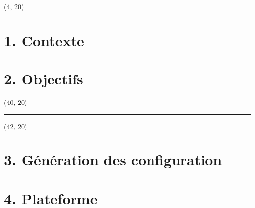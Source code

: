 \documentclass{beamer}
\begin{document}
\setlength{\TPHorizModule}{1cm}
\setlength{\TPVertModule}{1cm}


\maketitle

\begin{textblock}{36}(4, 20)
	\begin{minipage}{0.99\textwidth}
	\section{1. Contexte}
	\lipsum[1]
		
		
	\section{2. Objectifs}
	\lipsum[2-4]
	\end{minipage}
\end{textblock}
\begin{textblock}{2}(40, 20)
	\begin{minipage}{0.99\textwidth}
	\begin{center}
	\rule{5pt}{84cm}	
	\end{center}
	\end{minipage}
\end{textblock}
\begin{textblock}{36}(42, 20)
	\begin{minipage}{0.99\textwidth}
	
	\section{3. Génération des configuration}
	\lipsum[5-7]
	
	
	\section{4. Plateforme}
	\lipsum[8-9]
	\end{minipage}
\end{textblock}
\end{document}
